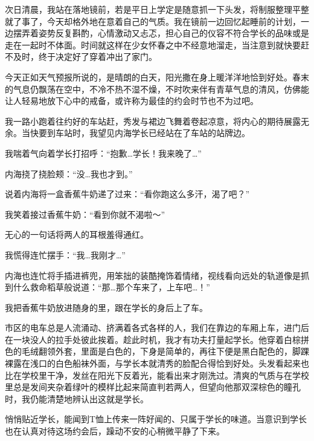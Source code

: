 \cutlinef\zzz

次日清晨，我站在落地镜前，若是平日上学定是随意抓一下头发，将制服整理平整就了事了，今天却格外地在意着自己的气质。我在镜前一边回忆起睡前的计划，一边摆弄着姿势反复斟酌，心情激动又忐忑，担心自己的仪容不符合学长的品味或是走在一起时不体面。时间就这样在少女怀春之中不经意地溜走，当注意到就快要赶不及时，终于决定好了穿着冲出了家门。

今天正如天气预报所说的，是晴朗的白天，阳光撒在身上暖洋洋地恰到好处。春末的气息仍飘荡在空中，不冷不热不湿不燥，不时吹来伴有青草气息的清风，仿佛能让人轻易地放下心中的戒备，或许称为最佳的约会时节也不为过吧。

我一路小跑着往约好的车站赶，秀发与裙边飞舞着卷起凉意，将内心的期待展露无余。当快要到车站时，我望见内海学长已经站在了车站的站牌边。

我喘着气向着学长打招呼：“抱歉…学长！我来晚了…”



内海挠了挠脸颊：“没…我也才到。”

说着内海将一盒香蕉牛奶递了过来：“看你跑这么多汗，渴了吧？”

我笑着接过香蕉牛奶：“看到你就不渴啦～”

无心的一句话将两人的耳根羞得通红。

我慌得连忙摆手：“我…我刚才…”

\newday{\windy\cloudy}

内海也连忙将手插进裤兜，用笨拙的装酷掩饰着情绪，视线看向远处的轨道像是抓到什么救命稻草般说道：“那…那个车来了，上车吧…！”


我把香蕉牛奶放进随身的里，跟在学长的身后上了车。



市区的电车总是人流涌动、挤满着各式各样的人，我们在靠边的车厢上车，进门后在一块没人的拉手处彼此挨着。趁此时机，我才有功夫打量起学长。他穿着白棕拼色的毛绒翻领外套，里面是白色的，下身是简单的，再往下便是黑白配色的，脚踝裸露在浅口的白色船袜外面，与学长本就清秀的脸配合得恰到好处。头发看起来也比在学校里干净，发丝在阳光下反着光，能看出来才刚洗过。清爽的气质与在学校里总是发间夹杂着绿叶的模样比起来简直判若两人，但望向他那双深棕色的瞳孔时，我仍能清楚地辨认出这就是学长。

悄悄贴近学长，能闻到T恤上传来一阵好闻的、只属于学长的味道。当意识到学长也在认真对待这场约会后，躁动不安的心稍微平静了下来。



